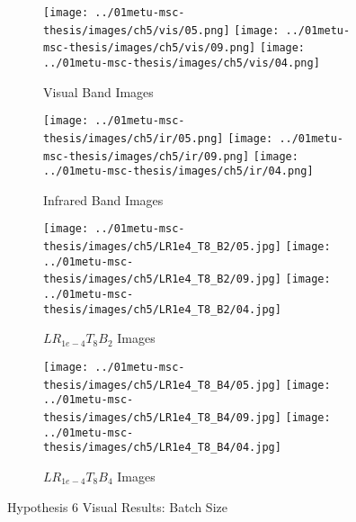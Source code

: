 \begin{figure}[htbp]
    \centering
    \begin{subfigure}[b]{\textwidth}
        \texttt{[image: ../01metu-msc-thesis/images/ch5/vis/05.png]}
        \texttt{[image: ../01metu-msc-thesis/images/ch5/vis/09.png]}
        \texttt{[image: ../01metu-msc-thesis/images/ch5/vis/04.png]}
        \caption{Visual Band Images}
    \end{subfigure}
    \vspace{0.01cm}
    \begin{subfigure}[b]{\textwidth}
        \texttt{[image: ../01metu-msc-thesis/images/ch5/ir/05.png]}
        \texttt{[image: ../01metu-msc-thesis/images/ch5/ir/09.png]}
        \texttt{[image: ../01metu-msc-thesis/images/ch5/ir/04.png]}
        \caption{Infrared Band Images}
    \end{subfigure}
    \vspace{0.01cm}
    \begin{subfigure}[b]{\textwidth}
        \texttt{[image: ../01metu-msc-thesis/images/ch5/LR1e4\_T8\_B2/05.jpg]}
        \texttt{[image: ../01metu-msc-thesis/images/ch5/LR1e4\_T8\_B2/09.jpg]}
        \texttt{[image: ../01metu-msc-thesis/images/ch5/LR1e4\_T8\_B2/04.jpg]}
        \caption{$LR_{1e-4}T_{8}B_{2}$ Images}
    \end{subfigure}
    \vspace{0.01cm}
    \begin{subfigure}[b]{\textwidth}
        \texttt{[image: ../01metu-msc-thesis/images/ch5/LR1e4\_T8\_B4/05.jpg]}
        \texttt{[image: ../01metu-msc-thesis/images/ch5/LR1e4\_T8\_B4/09.jpg]}
        \texttt{[image: ../01metu-msc-thesis/images/ch5/LR1e4\_T8\_B4/04.jpg]}
        \caption{$LR_{1e-4}T_{8}B_{4}$ Images}
    \end{subfigure}
    \caption{Hypothesis 6 Visual Results: Batch Size }
    \label{fig:ch5:met82}
\end{figure}

